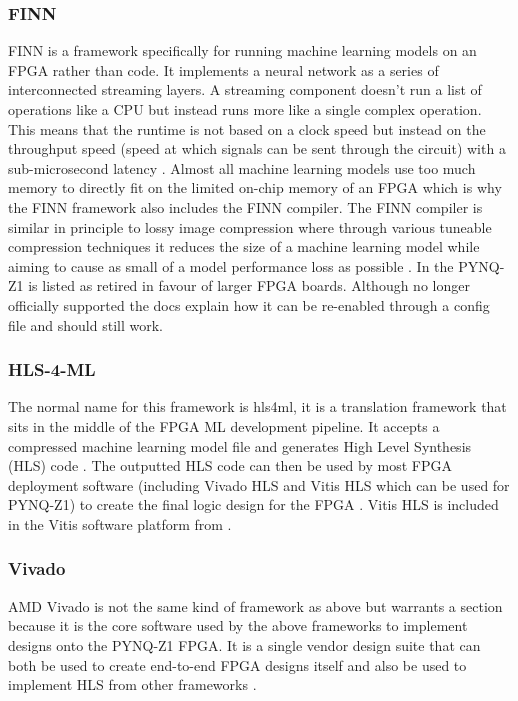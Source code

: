 \documentclass[12pt,nonacm,acmlarge,titlepage,screen]{acmart}
\begin{document}
		\subsubsection{FINN}
		FINN is a framework specifically for running machine learning models on an FPGA rather than code. It implements a neural network as a series of interconnected streaming layers. A streaming component doesn't run a list of operations like a CPU but instead runs more like a single complex operation. This means that the runtime is not based on a clock speed but instead on the throughput speed (speed at which signals can be sent through the circuit) with a sub-microsecond latency \cite{finn_project, finn_paper}. Almost all machine learning models use too much memory to directly fit on the limited on-chip memory of an FPGA which is why the FINN framework also includes the FINN compiler. The FINN compiler is similar in principle to lossy image compression where through various tuneable compression techniques it reduces the size of a machine learning model while aiming to cause as small of a model performance loss as possible \cite{finn_paper}. In \cite[Getting Started > Supported FPGA Hardware]{finn_docs} the PYNQ-Z1 is listed as retired in favour of larger FPGA boards. Although no longer officially supported the docs explain how it can be re-enabled through a config file and should still work.

		\subsubsection{HLS-4-ML}
		The normal name for this framework is hls4ml, it is a translation framework that sits in the middle of the FPGA ML development pipeline. It accepts a compressed machine learning model file and generates High Level Synthesis (HLS) code \cite{hls4ml_docs}. The outputted HLS code can then be used by most FPGA deployment software (including Vivado HLS and Vitis HLS which can be used for PYNQ-Z1) to create the final logic design for the FPGA \cite{hls4ml_paper, hls4ml_docs}. Vitis HLS is included in the Vitis software platform from \cite{vitis_paper}.

		\subsubsection{Vivado}
		AMD Vivado is not the same kind of framework as above but warrants a section because it is the core software used by the above frameworks to implement designs onto the PYNQ-Z1 FPGA. It is a single vendor design suite that can both be used to create end-to-end FPGA designs itself and also be used to implement HLS from other frameworks \cite{vivado_paper, vivado_paper_2012}.
		
\end{document}
